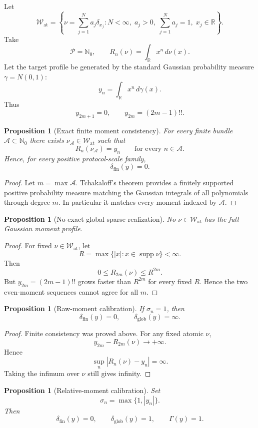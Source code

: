 \documentclass[11pt]{article}
\newtheorem{proposition}[definition]{Proposition}
\newcommand{\W}{\mathcal W}
\newcommand{\Pcal}{\mathcal P}
\newcommand{\Acal}{\mathcal A}
\begin{document}
Let
\[
\W_{\mathrm{at}}
=
\left\{
\nu=\sum_{j=1}^N a_j\delta_{x_j}:
N<\infty,\;
a_j>0,\;
\sum_{j=1}^N a_j=1,\;
x_j\in\mathbb R
\right\}.
\]
Take
\[
\Pcal=\mathbb N_0,
\qquad
R_n(\nu)=\int_{\mathbb R}x^n\,d\nu(x).
\]
Let the target profile be generated by the standard Gaussian probability
measure $\gamma=N(0,1)$:
\[
y_n=\int_{\mathbb R}x^n\,d\gamma(x).
\]
Thus
\[
y_{2m+1}=0,
\qquad
y_{2m}=(2m-1)!!.
\]

\begin{proposition}[Exact finite moment consistency]
For every finite bundle $\Acal\subset\mathbb N_0$ there exists
$\nu_{\Acal}\in\W_{\mathrm{at}}$ such that
\[
R_n(\nu_{\Acal})=y_n
\qquad
\text{for every }n\in\Acal.
\]
Hence, for every positive protocol-scale family,
\[
\delta_{\mathrm{fin}}(y)=0.
\]
\end{proposition}

\begin{proof}
Let $m=\max\Acal$. Tchakaloff's theorem provides a finitely supported positive
probability measure matching the Gaussian integrals of all polynomials through
degree $m$. In particular it matches every moment indexed by $\Acal$.
\end{proof}

\begin{proposition}[No exact global sparse realization]
No $\nu\in\W_{\mathrm{at}}$ has the full Gaussian moment profile.
\end{proposition}

\begin{proof}
For fixed $\nu\in\W_{\mathrm{at}}$, let
\[
R=\max\{|x|:x\in\operatorname{supp}\nu\}<\infty.
\]
Then
\[
0\le R_{2m}(\nu)\le R^{2m}.
\]
But $y_{2m}=(2m-1)!!$ grows faster than $R^{2m}$ for every fixed $R$.
Hence the two even-moment sequences cannot agree for all $m$.
\end{proof}

\begin{proposition}[Raw-moment calibration]
If $\sigma_n=1$, then
\[
\delta_{\mathrm{fin}}(y)=0,
\qquad
\delta_{\mathrm{glob}}(y)=\infty.
\]
\end{proposition}

\begin{proof}
Finite consistency was proved above. For any fixed atomic $\nu$,
\[
y_{2m}-R_{2m}(\nu)\to+\infty.
\]
Hence
\[
\sup_n|R_n(\nu)-y_n|=\infty.
\]
Taking the infimum over $\nu$ still gives infinity.
\end{proof}

\begin{proposition}[Relative-moment calibration]
Set
\[
\sigma_n=\max\{1,|y_n|\}.
\]
Then
\[
\delta_{\mathrm{fin}}(y)=0,
\qquad
\delta_{\mathrm{glob}}(y)=1,
\qquad
\Gamma(y)=1.
\]
\end{proposition}
\end{document}
